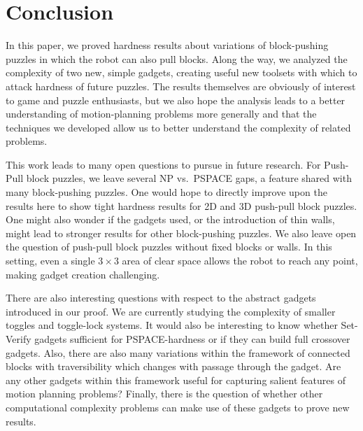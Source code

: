\section{Conclusion}
In this paper, we proved hardness results about variations of block-pushing puzzles in which the robot can also pull blocks. Along the way, we analyzed the complexity of two new, simple gadgets, creating useful new toolsets with which to attack hardness of future puzzles. The results themselves are obviously of interest to game and puzzle enthusiasts, but we also hope the analysis leads to a better understanding of motion-planning problems more generally and that the techniques we developed allow us to better understand the complexity of related problems.

This work leads to many open questions to pursue in future research. For Push-Pull block puzzles, we leave several NP vs.\ PSPACE gaps, a feature shared with many block-pushing puzzles. One would hope to directly improve upon the results here to show tight hardness results for 2D and 3D push-pull block puzzles. One might also wonder if the gadgets used, or the introduction of thin walls, might lead to stronger results for other block-pushing puzzles. We also leave open the question of push-pull block puzzles without fixed blocks or walls. In this setting, even a single $3\times3$ area of clear space allows the robot to reach any point, making gadget creation challenging.

There are also interesting questions with respect to the abstract gadgets introduced in our proof. We are currently studying the complexity of smaller toggles and toggle-lock systems. It would also be interesting to know whether Set-Verify gadgets sufficient for PSPACE-hardness or if they can build full crossover gadgets. Also, there are also many variations within the framework of connected blocks with traversibility which changes with passage through the gadget. Are any other gadgets within this framework useful for capturing salient features of motion planning problems? Finally, there is the question of whether other computational complexity problems can make use of these gadgets to prove new results.

